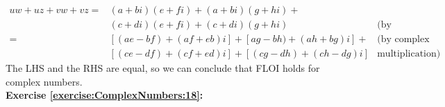 \begin{align*}
uw + uz + vw + vz = &(a + bi)(e + fi) + (a + bi)(g + hi) +\\
&(c + di)(e + fi) + (c + di)(g + hi)&  \text{(by substitution)}& \\
= &[(ae - bf) + (af + eb)i] + [ag -bh) + (ah + bg)i] + & \text{(by complex }\\
&[(ce - df) + (cf + ed)i] + [(cg - dh) + (ch - dg)i]& \text{multiplication)}
\end{align*}
The LHS and the RHS are equal, so we can conclude that FLOI holds for complex numbers.\\

\noindent\textbf{Exercise \ref{exercise:ComplexNumbers:18}:}%
\begin{multicols}{2}
\end{multicols}

